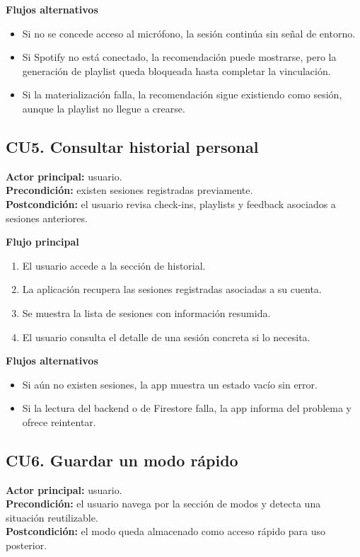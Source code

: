 \textbf{Flujos alternativos}
\begin{itemize}
    \item Si no se concede acceso al micrófono, la sesión continúa sin señal de entorno.
    \item Si Spotify no está conectado, la recomendación puede mostrarse, pero la generación de playlist queda bloqueada hasta completar la vinculación.
    \item Si la materialización falla, la recomendación sigue existiendo como sesión, aunque la playlist no llegue a crearse.
\end{itemize}

\subsection{CU5. Consultar historial personal}

\textbf{Actor principal:} usuario. \\
\textbf{Precondición:} existen sesiones registradas previamente. \\
\textbf{Postcondición:} el usuario revisa check-ins, playlists y feedback
asociados a sesiones anteriores.

\textbf{Flujo principal}
\begin{enumerate}[label=\arabic*.]
    \item El usuario accede a la sección de historial.
    \item La aplicación recupera las sesiones registradas asociadas a su cuenta.
    \item Se muestra la lista de sesiones con información resumida.
    \item El usuario consulta el detalle de una sesión concreta si lo necesita.
\end{enumerate}

\textbf{Flujos alternativos}
\begin{itemize}
    \item Si aún no existen sesiones, la app muestra un estado vacío sin error.
    \item Si la lectura del backend o de Firestore falla, la app informa del problema y ofrece reintentar.
\end{itemize}

\subsection{CU6. Guardar un modo rápido}

\textbf{Actor principal:} usuario. \\
\textbf{Precondición:} el usuario navega por la sección de modos y detecta una
situación reutilizable. \\
\textbf{Postcondición:} el modo queda almacenado como acceso rápido para uso
posterior.

